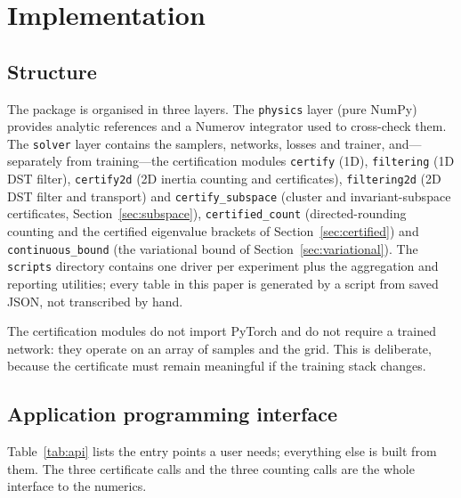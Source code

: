 \section{Implementation}
\label{sec:software}

\subsection{Structure}

The package is organised in three layers. The \texttt{physics} layer
(pure NumPy) provides analytic references and a Numerov integrator used to
cross-check them. The \texttt{solver} layer contains the samplers, networks,
losses and trainer, and---separately from training---the certification
modules \texttt{certify} (1D), \texttt{filtering} (1D DST filter),
\texttt{certify2d} (2D inertia counting and certificates),
\texttt{filtering2d} (2D DST filter and transport) and
\texttt{certify\_subspace} (cluster and invariant-subspace certificates,
Section~\ref{sec:subspace}), \texttt{certified\_count} (directed-rounding
counting and the certified eigenvalue brackets of
Section~\ref{sec:certified}) and \texttt{continuous\_bound} (the variational
bound of Section~\ref{sec:variational}). The \texttt{scripts}
directory contains one driver per experiment plus the aggregation and
reporting utilities; every table in this paper is generated by a script from
saved JSON, not transcribed by hand.

The certification modules do not import PyTorch and do not require a trained
network: they operate on an array of samples and the grid. This is deliberate,
because the certificate must remain meaningful if the training stack changes.

\subsection{Application programming interface}

Table~\ref{tab:api} lists the entry points a user needs; everything else is
built from them. The three certificate calls and the three counting calls are
the whole interface to the numerics.

